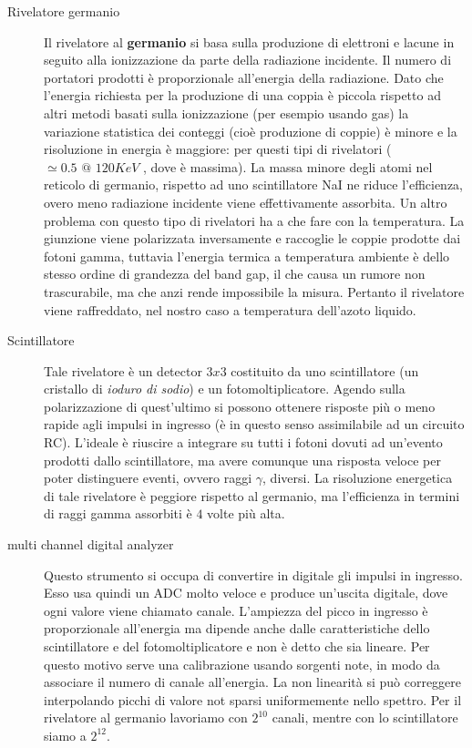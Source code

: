 \documentclass[11pt,a4paper]{article}
\begin{document}
\begin{description}
  \item[Rivelatore germanio] Il rivelatore al \textbf{germanio} si basa sulla produzione di elettroni e lacune in seguito alla ionizzazione da parte della radiazione incidente. Il numero di portatori prodotti è proporzionale all'energia della radiazione. Dato che l'energia richiesta per la produzione di una coppia è piccola rispetto ad altri metodi basati sulla ionizzazione (per esempio usando gas) la variazione statistica dei conteggi (cioè produzione di coppie) è minore e la risoluzione in energia è maggiore: per questi tipi di rivelatori ($\simeq 0.5 \text{ @ } 120 KeV$ , dove è massima).%
  La massa minore degli atomi nel reticolo di germanio, rispetto ad uno scintillatore NaI ne riduce l'efficienza, overo meno radiazione incidente viene effettivamente assorbita.
  Un altro problema con questo tipo di rivelatori ha a che fare con la temperatura. La giunzione viene polarizzata inversamente e raccoglie le coppie prodotte dai fotoni gamma, tuttavia l'energia termica a temperatura ambiente è dello stesso ordine di grandezza del band gap, il che causa un rumore non trascurabile, ma che anzi rende impossibile la misura. Pertanto il rivelatore viene raffreddato, nel nostro caso a temperatura dell'azoto liquido.
  \item [Scintillatore] Tale rivelatore è un detector $3x3$ costituito da uno scintillatore (un cristallo di \textit{ioduro di sodio}) e un fotomoltiplicatore. Agendo sulla polarizzazione di quest'ultimo si possono ottenere risposte più o meno rapide agli impulsi in ingresso (è in questo senso assimilabile ad un circuito RC). L'ideale è riuscire a integrare su tutti i fotoni dovuti ad un'evento prodotti dallo scintillatore, ma avere comunque una risposta veloce per poter distinguere eventi, ovvero raggi $\gamma$, diversi. La risoluzione energetica di tale rivelatore è peggiore rispetto al germanio, ma l'efficienza in termini di raggi gamma assorbiti è $4$ volte più alta.
  \item [multi channel digital analyzer] Questo strumento si occupa di convertire in digitale gli impulsi in ingresso. Esso usa quindi un ADC molto veloce e produce un'uscita digitale, dove ogni valore viene chiamato canale. L'ampiezza del picco in ingresso è proporzionale all'energia ma dipende anche dalle caratteristiche dello scintillatore e del fotomoltiplicatore e non è detto che sia lineare. Per questo motivo serve una calibrazione usando sorgenti note, in modo da associare il numero di canale all'energia. La non linearità si può correggere interpolando picchi di valore not sparsi uniformemente nello spettro. Per il rivelatore al germanio lavoriamo con $2^{10}$ canali, mentre con lo scintillatore siamo a $2^{12}$.

\end{description}
\end{document}
